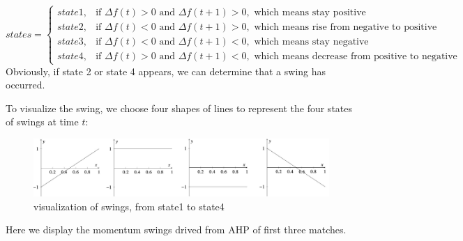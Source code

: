 $$states=\begin{cases}
    state1, &\text{if } \Delta f(t)>0 \text{ and } \Delta f(t+1)>0, \text{ which means stay positive}\\
    state2, &\text{if } \Delta f(t)<0 \text{ and } \Delta f(t+1)>0, \text{ which means rise from negative to positive}\\
    state3, &\text{if } \Delta f(t)<0 \text{ and } \Delta f(t+1)<0, \text{ which means stay negative}\\
    state4, &\text{if } \Delta f(t)>0 \text{ and } \Delta f(t+1)<0, \text{ which means decrease from positive to negative}
\end{cases}$$
Obviously, if state 2 or state 4 appears, we can determine that a swing has occurred. 

To visualize the swing, we choose four shapes of lines to represent the four states of swings at time $t$:

\begin{figure}[H]
    \centering
        \includegraphics[width=\linewidth]{mainmatter/imgs/states.jpg}
    \caption{visualization of swings, from state1 to state4}
    \label{fig:states}
\end{figure}

Here we display the momentum swings drived from AHP of first three matches.

